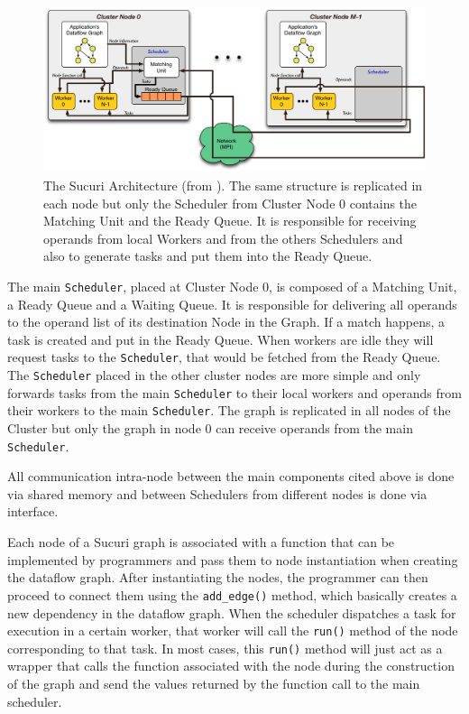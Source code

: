 \begin{figure}[htbp]
    \centering
    \includegraphics[scale=0.65]{figuras/dataflow/SucuriArchitectureHorizonal.png}
    \caption{The Sucuri Architecture (from \cite{sucuri-original}). The same structure is replicated in each node but only the Scheduler from Cluster Node 0 contains the Matching Unit and the Ready Queue. It is responsible for receiving operands from local Workers and from the others Schedulers and also to generate tasks and put them into the Ready Queue.}
    \label{fig:arch}
\end{figure}

The main \texttt{Scheduler}, placed at Cluster Node 0, is composed of a Matching Unit, a Ready Queue and a Waiting Queue. It is responsible for delivering all operands to the operand list of its destination Node in the Graph. If a match happens, a task is created and put in the Ready Queue. When workers are idle they will request tasks to the \texttt{Scheduler}, that would be fetched from the Ready Queue. The \texttt{Scheduler} placed in the other cluster nodes are more simple and only forwards tasks from the main \texttt{Scheduler} to their local workers and operands from their workers to the main \texttt{Scheduler}. The graph is replicated in all nodes of the Cluster but only the graph in node 0 can receive operands from the main \texttt{Scheduler}.

All communication intra-node between the main components cited above is done via shared memory and between Schedulers from different nodes is done via interface.

Each node of a Sucuri graph is associated with a function that can be implemented by programmers and pass them to node instantiation when creating the dataflow graph. After instantiating the nodes, the programmer can then proceed to connect them using the \texttt{add\_edge()} method, which basically creates a new dependency in the dataflow graph. When the scheduler dispatches a task for execution in a certain worker, that worker will call the \texttt{run()} method of the node corresponding to that task. In most cases, this \texttt{run()} method will just act as a wrapper that calls the function associated with the node during the construction of the graph and send the values returned by the function call to the main scheduler.

